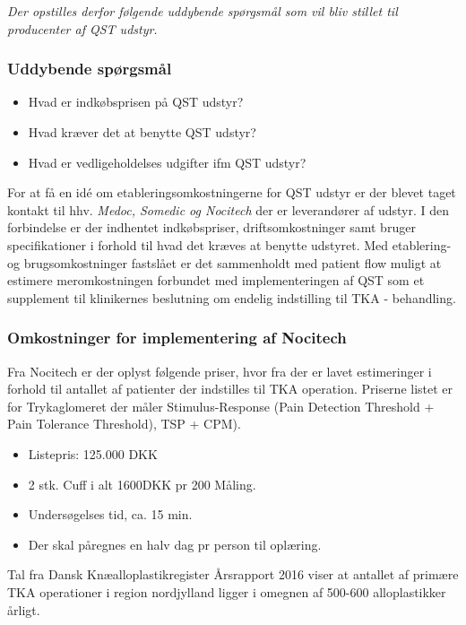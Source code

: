 \textit{Der opstilles derfor følgende uddybende spørgsmål som vil bliv stillet til producenter af QST udstyr. }

\subsubsection*{Uddybende spørgsmål}

\begin{itemize}  
\item Hvad er indkøbsprisen på QST udstyr? 
\item Hvad kræver det at benytte QST udstyr? 
\item Hvad er vedligeholdelses udgifter ifm QST udstyr?
\end{itemize}


For at få en idé om etableringsomkostningerne for QST udstyr er der blevet taget kontakt til hhv. \emph{Medoc, Somedic og Nocitech} der er leverandører af udstyr. I den forbindelse er der indhentet indkøbspriser, driftsomkostninger samt bruger specifikationer i forhold til hvad det kræves at benytte udstyret. Med etablering- og brugsomkostninger fastslået er det sammenholdt med patient flow muligt at estimere meromkostningen forbundet med implementeringen af QST som et supplement til klinikernes beslutning om endelig indstilling til TKA - behandling. 

\subsubsection*{Omkostninger for implementering af Nocitech}
\label{priser}

Fra Nocitech er der oplyst følgende priser, hvor fra der er lavet estimeringer i forhold til antallet af patienter der indstilles til TKA operation. Priserne listet er for Trykaglomeret der måler Stimulus-Response (Pain Detection Threshold + Pain Tolerance Threshold), TSP + CPM).

\begin{itemize}  
\item Listepris: 125.000 DKK
\item 2 stk. Cuff i  alt 1600DKK pr 200 Måling.
\item Undersøgelses tid, ca. 15 min.
\item Der skal påregnes en halv dag pr person til oplæring.
\end{itemize}

Tal fra Dansk Knæalloplastikregister Årsrapport 2016 viser at antallet af primære TKA operationer i region nordjylland ligger i omegnen af 500-600 alloplastikker årligt.\citep{aarsrapport2016} 

